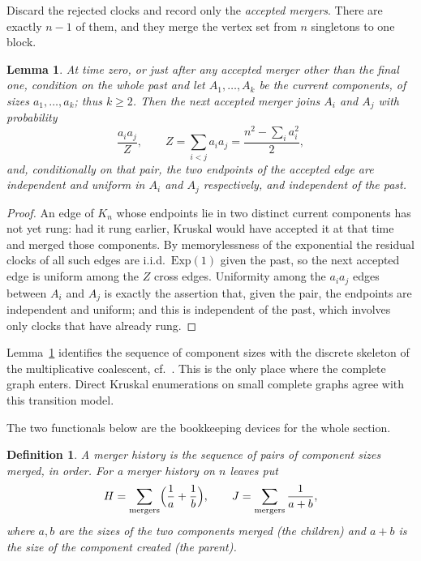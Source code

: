 \documentclass[10pt,a4paper]{amsart}
\newtheorem{lemma}[theorem]{Lemma}
\newtheorem{definition}[theorem]{Definition}
\begin{document}
Discard the rejected clocks and record only the \emph{accepted mergers}. There are
exactly $n-1$ of them, and they merge the vertex set from $n$ singletons to one
block.

\begin{lemma}
\label{lem:coalescent}
At time zero, or just after any accepted merger other than the final one,
condition on the whole past and let $A_1,\dots,A_k$ be the current components,
of sizes $a_1,\dots,a_k$; thus $k\ge2$. Then the next accepted merger joins
$A_i$ and $A_j$ with
probability
\begin{equation}
\label{eq:mcrate}
\frac{a_ia_j}{Z},\qquad Z=\sum_{i<j}a_ia_j=\frac{n^2-\sum_i a_i^2}{2},
\end{equation}
and, conditionally on that pair, the two endpoints of the accepted edge are
independent and uniform in $A_i$ and $A_j$ respectively, and independent of the
past.
\end{lemma}

\begin{proof}
An edge of $K_n$ whose endpoints lie in two distinct current components has not
yet rung: had it rung earlier, Kruskal would have accepted it at that time and
merged those components. By memorylessness of the exponential the residual
clocks of all such edges are i.i.d.\ $\mathrm{Exp}(1)$ given the past, so the
next accepted edge is uniform among the $Z$ cross edges. Uniformity among the
$a_ia_j$ edges between $A_i$ and $A_j$ is exactly the assertion that, given the
pair, the endpoints are independent and uniform; and this is independent of the
past, which involves only clocks that have already rung.
\end{proof}

Lemma~\ref{lem:coalescent} identifies the sequence of component sizes with the
discrete skeleton of the multiplicative coalescent, cf.\ \cite{Aldous}. This is
the only place where the complete graph enters. Direct Kruskal enumerations on
small complete graphs agree with this transition model.

The two functionals below are the bookkeeping devices for the whole section.

\begin{definition}
\label{def:HJ}
A \emph{merger history} is the sequence of pairs of component sizes merged, in
order. For a merger history on $n$ leaves put
\[
H=\sum_{\text{mergers}}\Bigl(\frac1a+\frac1b\Bigr),
\qquad
J=\sum_{\text{mergers}}\frac1{a+b},
\]
where $a,b$ are the sizes of the two components merged (the \emph{children}) and
$a+b$ is the size of the component created (the \emph{parent}).
\end{definition}
\end{document}
